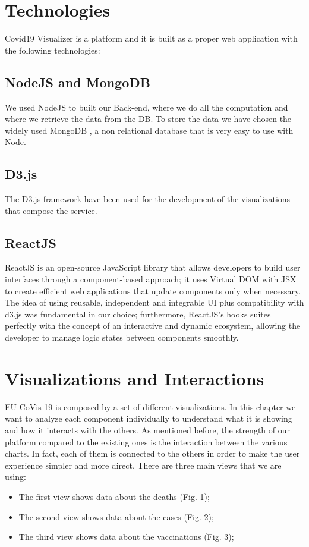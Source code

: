 \documentclass[10pt,conference]{IEEEtran}
\begin{document}
\section{Technologies}
Covid19 Visualizer is a platform and it is built as a proper web application with the following technologies:

\subsection{NodeJS and MongoDB}
We used NodeJS \cite{node} to built our Back-end, where we do all the computation and where we retrieve the data from the DB. To store the data we have chosen the widely used
MongoDB \cite{mongo}, a non relational database that is very easy to use with Node.

\subsection{D3.js}
The D3.js framework \cite{d3} have been used for the development of the visualizations that compose the service.

\subsection{ReactJS}
ReactJS is an open-source JavaScript library that allows developers to build user interfaces through a component-based approach; it uses Virtual DOM with JSX to create efficient web applications that update components only when necessary.
The idea of using reusable, independent and integrable UI plus compatibility with d3.js was fundamental in our choice;
furthermore, ReactJS's hooks suites perfectly with the concept of an interactive and dynamic ecosystem, allowing the developer to manage logic states between components smoothly.


\section{Visualizations and Interactions}
EU CoVis-19 is composed by a set of different visualizations. In this chapter we want to analyze each component individually to understand what it
is showing and how it interacts with the others. As mentioned before, the strength of our platform compared to the existing ones is 
the interaction between the various charts. In fact, each of them is connected to the others in order to make the user experience 
simpler and more direct.
There are three main views that we are using:
\begin{itemize}
	\item The first view shows data about the deaths (Fig. 1);
	\item The second view shows data about the cases (Fig. 2);
	\item The third view shows data about the vaccinations (Fig. 3);
\end{itemize}
\end{document}
